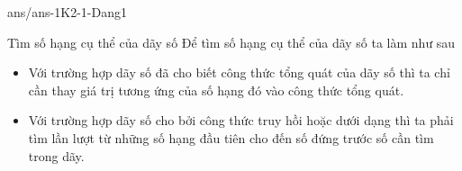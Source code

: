 \begin{indapan}{10}
	{ans/ans-1K2-1-Dang1}
\end{indapan}

\begin{dang}{Tìm số hạng cụ thể của dãy số}
	Để tìm số hạng cụ thể của dãy số ta làm như sau
	\begin{itemize} 
		\item Với trường hợp dãy số đã cho biết công thức tổng quát của dãy số thì ta chỉ cần thay giá trị tương ứng của số hạng đó vào công thức tổng quát.
		\item  Với trường hợp dãy số cho bởi công thức truy hồi hoặc dưới dạng thì ta phải tìm lần lượt từ những số hạng đầu tiên cho đến số đứng trước số cần tìm trong dãy.
	\end{itemize}
\end{dang}
